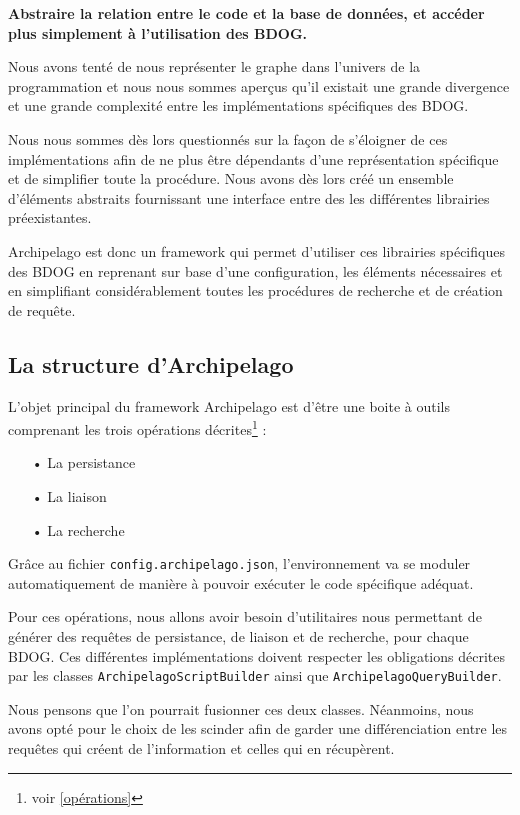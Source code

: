 \documentclass[a4paper,fleqn,12pt,oneside]{report}
\begin{document}
\begin{center}
\textbf{Abstraire la relation entre le code et la base de données, et accéder plus simplement à l’utilisation des BDOG. }
\end{center} 

Nous avons tenté de nous représenter le graphe dans l'univers de la programmation et nous nous sommes aperçus qu'il existait une grande divergence et une grande complexité entre les implémentations spécifiques des BDOG.

Nous nous sommes dès lors questionnés sur la façon de s'éloigner de ces implémentations afin de ne plus être dépendants d'une représentation spécifique et de simplifier toute la procédure. Nous avons dès lors créé un ensemble d'éléments abstraits fournissant une interface entre des les différentes librairies préexistantes.

Archipelago est donc un framework qui permet d'utiliser ces librairies spécifiques des BDOG en reprenant sur base d’une configuration, les éléments nécessaires et en simplifiant considérablement toutes les procédures de recherche et de création de requête.
\subsection{La structure d'Archipelago}

L'objet principal du framework Archipelago est d'être une boite à outils comprenant les trois opérations décrites\footnote{voir \ref{opérations}} :
\begin{itemize}
\item[•] La persistance
\item[•] La liaison
\item[•] La recherche
\end{itemize}

Grâce au fichier \texttt{config.archipelago.json}, l'environnement va se moduler automatiquement de manière à pouvoir exécuter le code spécifique adéquat.

Pour ces opérations, nous allons avoir besoin d'utilitaires nous permettant de générer des requêtes de persistance, de liaison et de recherche, pour chaque BDOG. Ces différentes implémentations doivent respecter les obligations décrites par les classes \texttt{ArchipelagoScriptBuilder} ainsi que \texttt{ArchipelagoQueryBuilder}.

Nous pensons que l'on pourrait fusionner ces deux classes. Néanmoins, nous avons opté pour le choix de les scinder afin de garder une différenciation entre les requêtes qui créent de l'information et celles qui en récupèrent.
\end{document}
